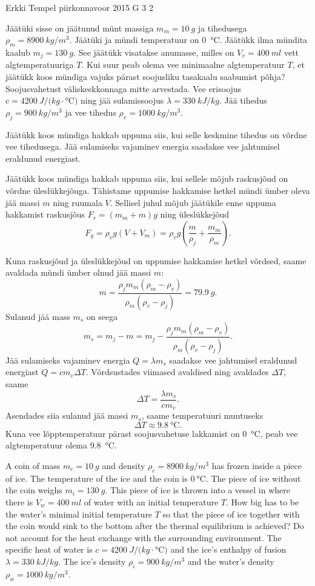{Erkki Tempel} %
{piirkonnavoor} %
{2015} %
{G 3} %
{2} %
{
\ifStatement
Jäätüki sisse on jäätunud münt massiga $m_m=\SI{10}{g}$ ja tihedusega $\rho_m=\SI{8900}{kg/m^3}$. Jäätüki ja mündi temperatuur on \SI{0}{\celsius}. Jäätükk ilma mündita kaalub $m_j=\SI{130}{g}$. See jäätükk visatakse anumasse, milles on $V_v=\SI{400}{ml}$ vett algtemperatuuriga $T$. Kui suur peab olema vee minimaalne algtemperatuur $T$, et jäätükk koos mündiga vajuks pärast soojusliku tasakaalu saabumist põhja? Soojusvahetust väliskeskkonnaga mitte arvestada. Vee erisoojus $c=\SI{4200}{J/ (kg\cdot\celsius)}$ ning jää sulamissoojus $\lambda=\SI{330}{kJ/kg}$. Jää tihedus $\rho_j=\SI{900}{kg/m^3}$ ja vee tihedus $\rho_v=\SI{1000}{kg/m^3}$.
\fi


\ifHint
Jäätükk koos mündiga hakkab uppuma siis, kui selle keskmine tihedus on võrdne vee tihedusega. Jää sulamiseks vajaminev energia saadakse vee jahtumisel eraldunud energiast.
\fi


\ifSolution
Jäätükk koos mündiga hakkab uppuma siis, kui sellele mõjub raskusjõud on võrdne üleslükkejõuga. Tähistame uppumise hakkamise hetkel mündi ümber oleva jää massi $m$ ning ruumala $V$. Sellisel juhul mõjub jäätükile enne uppuma hakkamist raskusjõus $F_r=(m_m+m)g$ ning üleslükkejõud
\[ F_y=\rho_v g(V + V_m)=\rho_v g\left(\frac{m}{\rho_j} + \frac{m_m}{\rho_m}\right). \]

Kuna raskusjõud ja üleslükkejõud on uppumise hakkamise hetkel võrdsed, saame avaldada mündi ümber olnud jää massi $m$:
\[ m = \frac{\rho_j m_m(\rho_m - \rho_v)}{\rho_m(\rho_v - \rho_j)} = \SI{79,9}{g}. \]
Sulanud jää mass $m_s$ on seega
\[ m_s = m_j - m = m_j - \frac{\rho_j m_m(\rho_m - \rho_v)}{\rho_m(\rho_v - \rho_j)}. \]
Jää sulamiseks vajaminev energia $Q=\lambda m_s$ saadakse vee jahtumisel eraldunud energiast $Q=cm_v\Delta T$. Võrdsustades viimased avaldised ning avaldades $\Delta T$, saame
\[ \Delta T = \frac{\lambda m_s}{cm_v}. \]
Asendades siia sulanud jää massi $m_s$, saame temperatuuri muutuseks
\[ \Delta T \approx \SI{9,8}{\celsius}. \]
Kuna vee lõpptemperatuur pärast soojusvahetuse lakkamist on \SI{0}{\celsius}, peab vee algtemperatuur olema \SI{9,8}{\celsius}.
\fi


\ifEngStatement
A coin of mass $m_c=\SI{10}{g}$ and density $\rho_c=\SI{8900}{kg/m^3}$ has frozen inside a piece of ice. The temperature of the ice and the coin is $\SI{0}{\celsius}$. The piece of ice without the coin weighs $m_i=\SI{130}{g}$. This piece of ice is thrown into a vessel in where there is $V_w=\SI{400}{ml}$ of water with an initial temperature $T$. How big has to be the water’s minimal initial temperature $T$ so that the piece of ice together with the coin would sink to the bottom after the thermal equilibrium is achieved? Do not account for the heat exchange with the surrounding environment. The specific heat of water is $c=\SI{4200}{J/ (kg\cdot\celsius)}$ and the ice’s enthalpy of fusion $\lambda=\SI{330}{kJ/kg}$. The ice’s density $\rho_i=\SI{900}{kg/m^3}$ and the water’s density $\rho_w=\SI{1000}{kg/m^3}$.
\fi


}
